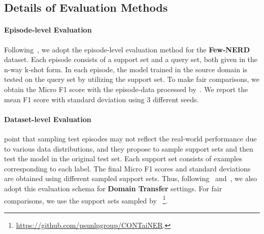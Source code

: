 \documentclass[11pt]{article}
\begin{document}
\begin{table}[htb]
    \centering
    \small
    \caption{Dataset statistics}
    \vspace{-3mm}
    \label{tab:dataset-statistic}
\end{table}

\subsection{Details of Evaluation Methods}\label{appendix_eval_methods}



\paragraph{Episode-level Evaluation}
Following~\citet{ma-etal-2022-decomposed}, we adopt the episode-level evaluation method for the \textbf{Few-NERD} dataset. 
Each episode consists of a support set and a query set, both given in the n-way k-shot form. 
In each episode, the model trained in the source domain is tested on the query set by utilizing the support set. 
To make fair comparisons, we obtain the Micro F1 score with the episode-data processed by~\citet{ding2021few}. 
We report the mean F1 score with standard deviation using 3 different seeds.

\paragraph{Dataset-level Evaluation}
\citet{yang-katiyar-2020-simple} point that sampling test episodes may not reflect the real-world performance due to various data distributions, and they propose to sample support sets and then test the model in the original test set.
Each support set consists of  examples corresponding to each label.
The final Micro F1 scores and standard deviations are obtained using different sampled support sets.
Thus, following~\citet{yang-katiyar-2020-simple} and~\citet{das-etal-2022-container}, we also adopt this evaluation schema for \textbf{Domain Transfer} settings.
For fair comparisons, we use the support sets sampled by \citet{das-etal-2022-container}~\footnote{\url{https://github.com/psunlpgroup/CONTaiNER}.}.
\end{document}
